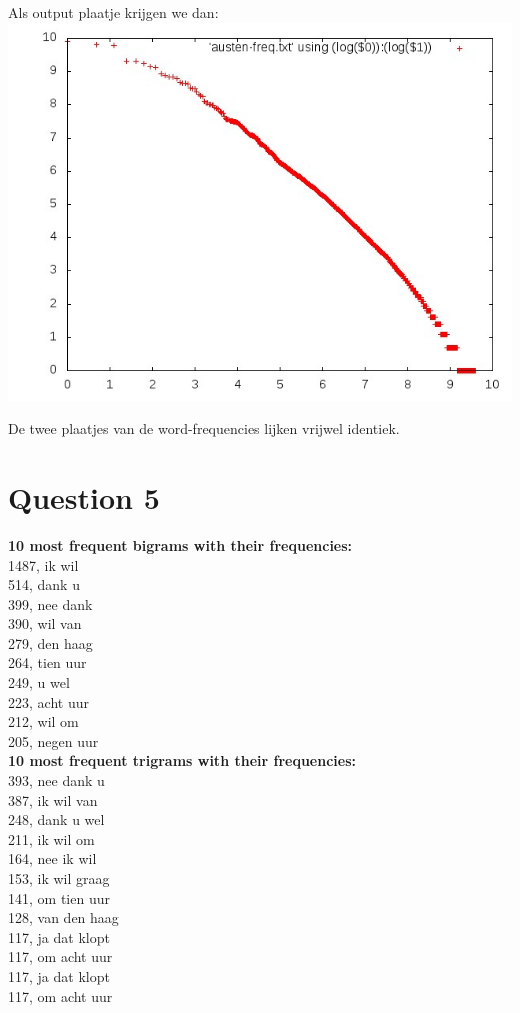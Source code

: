 \documentclass[a4paper,11pt]{article}
\begin{document}
\noindent Als output plaatje krijgen we dan:\\
\includegraphics[scale=0.4]{austen.jpg}

\noindent De twee plaatjes van de word-frequencies lijken vrijwel identiek.
\newpage

\section*{Question 5}
\textbf{10 most frequent bigrams with their frequencies: }\\
1487, ik wil\\
514, dank u\\
399, nee dank\\
390, wil van\\
279, den haag\\
264, tien uur\\
249, u wel\\
223, acht uur\\
212, wil om\\
205, negen uur\\

\noindent \textbf{10 most frequent trigrams with their frequencies: }\\
393, nee dank u\\
387, ik wil van\\
248, dank u wel\\
211, ik wil om\\
164, nee ik wil\\
153, ik wil graag\\
141, om tien uur\\
128, van den haag\\
117, ja dat klopt\\
117, om acht uur\\
117, ja dat klopt\\
117, om acht uur\\
\end{document}
